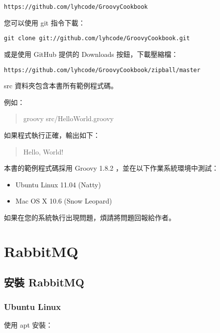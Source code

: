 \documentclass[a4paper,12pt,english]{sphinxmanual}
\begin{document}
\begin{Verbatim}[commandchars=@\[\]]
https://github.com/lyhcode/GroovyCookbook
\end{Verbatim}

您可以使用 git 指令下載：

\begin{Verbatim}[commandchars=@\[\]]
git clone git://github.com/lyhcode/GroovyCookbook.git
\end{Verbatim}

或是使用 GitHub 提供的 Downloads 按鈕，下載壓縮檔：

\begin{Verbatim}[commandchars=@\[\]]
https://github.com/lyhcode/GroovyCookbook/zipball/master
\end{Verbatim}

src 資料夾包含本書所有範例程式碼。

例如：
\begin{quote}

groovy src/HelloWorld.groovy
\end{quote}

如果程式執行正確，輸出如下：
\begin{quote}

Hello, World!
\end{quote}

本書的範例程式碼採用 Groovy 1.8.2 ，並在以下作業系統環境中測試：
\begin{itemize}
\item {} 
Ubuntu Linux 11.04 (Natty)

\item {} 
Mac OS X 10.6 (Snow Leopard)

\end{itemize}

如果在您的系統執行出現問題，煩請將問題回報給作者。


\chapter{RabbitMQ}
\label{rabbitmq::doc}\label{rabbitmq:rabbitmq}

\section{安裝 RabbitMQ}
\label{rabbitmq:id1}

\subsection{Ubuntu Linux}
\label{rabbitmq:ubuntu-linux}
使用 apt 安裝：
\end{document}
